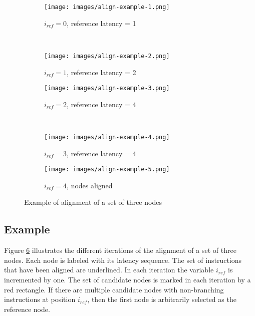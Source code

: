 \begin{figure}
    \centering
    \begin{subfigure}[t]{0.5\textwidth}
        \centering
        \texttt{[image: images/align-example-1.png]}
        \caption{$i_{ref}=0$, reference latency = 1}
        \label{fig:align-example-1}
    \end{subfigure}%
    ~
	\begin{subfigure}[t]{0.5\textwidth}
    \centering
    \texttt{[image: images/align-example-2.png]}
    \caption{$i_{ref}=1$, reference latency = 2}
    \label{fig:align-example-2}
    \end{subfigure}%
  	
	\begin{subfigure}[t]{0.5\textwidth}
		\centering
    	\texttt{[image: images/align-example-3.png]}
    	\caption{$i_{ref}=2$, reference latency = 4}
    	\label{fig:align-example-3}
    \end{subfigure}%
    ~
    \begin{subfigure}[t]{0.5\textwidth}
    \centering
    \texttt{[image: images/align-example-4.png]}
    \caption{$i_{ref}=3$, reference latency = 4}
    \label{fig:align-example-4}
    \end{subfigure}
    
    \begin{subfigure}[t]{0.5\textwidth}
    \centering
    \texttt{[image: images/align-example-5.png]}
    \caption{$i_{ref}=4$, nodes aligned}
    \label{fig:align-example-5}
    \end{subfigure}

    \caption{Example of alignment of a set of three nodes}
    \label{fig:align-example}
\end{figure}

\subsection{Example}
Figure \ref{fig:align-example} illustrates the different iterations of the alignment of a set of three nodes. 
Each node is labeled with its latency sequence. The set of instructions that have been aligned are underlined. In each iteration the variable $i_{ref}$ is incremented by one. 
The set of candidate nodes is marked in each iteration by a red rectangle. 
If there are multiple candidate nodes with non-branching instructions at position $i_{ref}$, then the first node is arbitrarily selected as the reference node.  


